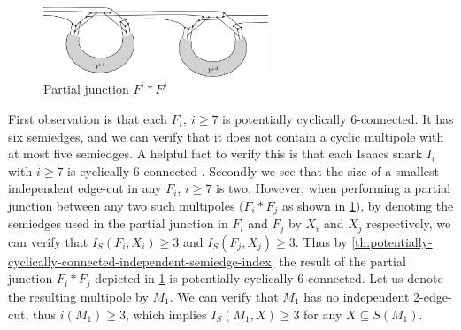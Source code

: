 \documentclass[12pt, twoside]{book}
\begin{document}
\begin{example}
	\begin{figure}
		\centering
		\includegraphics[width=0.6\textwidth]{images/Gi-first-partial-junction}
		\caption{Partial junction $F^i*F^j$}
		\label{fig:Gi-first-partial-junction}
	\end{figure}

	First observation is that each $F_i,~i\geq 7$ is potentially cyclically 6-connected. It has six semiedges, and we can verify that it does not contain a cyclic multipole with at most five semiedges. A helpful fact to verify this is that each Isaacs snark $I_i$ with $i\geq 7$ is cyclically 6-connected \cite{Mazak2022}. Secondly we see that the size of a smallest independent edge-cut in any $F_i$, $i\geq 7$ is two. However, when performing a partial junction between any two such multipoles ($F_i*F_j$ as shown in \cref{fig:Gi-first-partial-junction}), by denoting the semiedges used in the partial junction in $F_i$ and $F_j$ by $X_i$ and $X_j$ respectively, we can verify that $I_S(F_i,X_i)\geq 3$ and $I_S(F_j,X_j)\geq 3$. Thus by \cref{th:potentially-cyclically-connected-independent-semiedge-index} the result of the partial junction $F_i*F_j$ depicted in \cref{fig:Gi-first-partial-junction}  is potentially cyclically 6-connected. Let us denote the resulting multipole by $M_1$. We can verify that $M_1$ has no independent 2-edge-cut, thus $i(M_1)\geq 3$, which implies $I_S(M_1, X)\geq 3$ for any $X\subseteq S(M_1)$.
		

\end{example}
\end{document}
